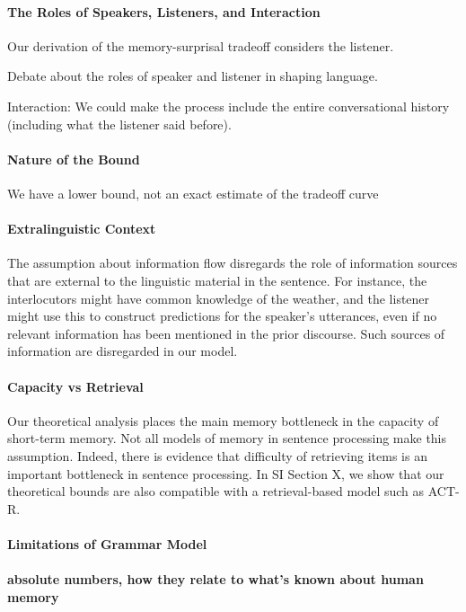 \paragraph{The Roles of Speakers, Listeners, and Interaction}
Our derivation of the memory-surprisal tradeoff considers the listener.

Debate about the roles of speaker and listener in shaping language.

Interaction: We could make the process include the entire conversational history (including what the listener said before).

\paragraph{Nature of the Bound}
We have a lower bound, not an exact estimate of the tradeoff curve

\paragraph{Extralinguistic Context}
The assumption about information flow disregards the role of information sources that are external to the linguistic material in the sentence.
For instance, the interlocutors might have common knowledge of the weather, and the listener might use this to construct predictions for the speaker's utterances, even if no relevant information has been mentioned in the prior discourse.
Such sources of information are disregarded in our model.

\paragraph{Capacity vs Retrieval}
Our theoretical analysis places the main memory bottleneck in the capacity of short-term memory.
Not all models of memory in sentence processing make this assumption.
Indeed, there is evidence that difficulty of retrieving items is an important bottleneck in sentence processing.
In SI Section X, we show that our theoretical bounds are also compatible with a retrieval-based model such as ACT-R.


\paragraph{Limitations of Grammar Model}

\paragraph{absolute numbers, how they relate to what's known about human memory}

